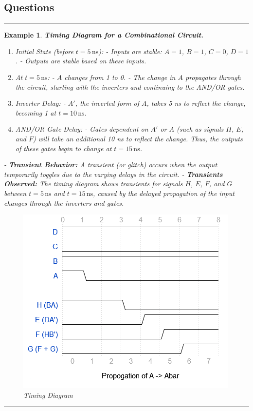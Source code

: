 \documentclass[12pt]{article}
\newtheorem{example}{Example}
\newenvironment{examp}
{\vspace{0.5cm}
\hrule
\begin{example}}
{\hrule
\vspace{0.5cm}
\end{example}}
\begin{document}
\subsection*{Questions}
\begin{examp}
	\textbf{Timing Diagram for a Combinational Circuit.}
	\begin{enumerate}
		\item  Initial State (before \(t = 5 \, \text{ns}\)):
		      - Inputs are stable: \(A = 1\), \(B = 1\), \(C = 0\), \(D = 1\).
		      - Outputs are stable based on these inputs.

		\item At \(t = 5 \, \text{ns}\):
		      - \(A\) changes from 1 to 0.
		      - The change in \(A\) propagates through the circuit, starting with the inverters and continuing to the AND/OR gates.

		\item Inverter Delay:
		      - \(A'\), the inverted form of \(A\), takes 5 ns to reflect the change, becoming 1 at \(t = 10 \, \text{ns}\).

		\item AND/OR Gate Delay:
		      - Gates dependent on \(A'\) or \(A\) (such as signals \(H\), \(E\), and \(F\)) will take an additional 10 ns to reflect the change. Thus, the outputs of these gates begin to change at \(t = 15 \, \text{ns}\).
	\end{enumerate}
	- \textbf{Transient Behavior:} A transient (or glitch) occurs when the output temporarily toggles due to the varying delays in the circuit.
	\newline
	- \textbf{Transients Observed:} The timing diagram shows transients for signals \(H\), \(E\), \(F\), and \(G\) between \(t = 5 \, \text{ns}\) and \(t = 15 \, \text{ns}\), caused by the delayed propagation of the input changes through the inverters and gates.
	\begin{figure}[H]
		\centering
		\includegraphics[scale=.65]{examp051.png}
		\caption{Timing Diagram}
	\end{figure}

\end{examp}
\end{document}
